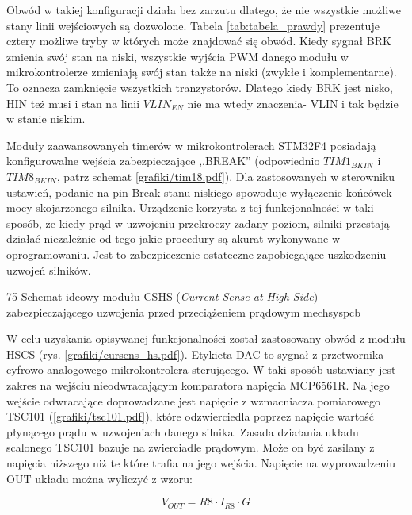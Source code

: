 Obwód w takiej konfiguracji działa bez zarzutu dlatego, że nie wszystkie możliwe stany linii wejściowych są dozwolone. Tabela \ref{tab:tabela_prawdy} prezentuje cztery możliwe tryby w których może znajdować się obwód. Kiedy sygnał BRK zmienia swój stan na niski, wszystkie wyjścia PWM danego modułu w mikrokontrolerze zmieniają swój stan także na niski (zwykłe i komplementarne). To oznacza zamknięcie wszystkich tranzystorów. Dlatego kiedy BRK jest nisko, HIN też musi i stan na linii $ VLIN_{EN} $ nie ma wtedy znaczenia- VLIN i tak będzie w stanie niskim.

\clearpage


Moduły zaawansowanych timerów w mikrokontrolerach STM32F4 posiadają konfigurowalne wejścia zabezpieczające ,,BREAK'' (odpowiednio $ TIM1_{BKIN} $ i $ TIM8_{BKIN} $, patrz schemat \ref{grafiki/tim18.pdf}). Dla zastosowanych w sterowniku ustawień, podanie na pin Break stanu niskiego spowoduje wyłączenie końcówek mocy skojarzonego silnika. Urządzenie korzysta z tej funkcjonalności w taki sposób, że kiedy prąd w uzwojeniu przekroczy zadany poziom, silniki przestają działać niezależnie od tego jakie procedury są akurat wykonywane w oprogramowaniu. Jest to zabezpieczenie ostateczne zapobiegające uszkodzeniu uzwojeń silników.

	{75}
	{Schemat ideowy modułu CSHS ({\it Current Sense at High Side}) zabezpieczającego uzwojenia przed przeciążeniem prądowym}
	{mechsyspcb}
	
W celu uzyskania opisywanej funkcjonalności został zastosowany obwód z modułu HSCS (rys. \ref{grafiki/cursens_hs.pdf}). Etykieta DAC to sygnał z przetwornika cyfrowo-analogowego mikrokontrolera sterującego. W taki sposób ustawiany jest zakres na wejściu nieodwracającym komparatora napięcia MCP6561R. Na jego wejście odwracające doprowadzane jest napięcie z wzmacniacza pomiarowego TSC101 (\ref{grafiki/tsc101.pdf}), które odzwierciedla poprzez napięcie wartość płynącego prądu w uzwojeniach danego silnika. Zasada działania układu scalonego TSC101 bazuje na zwierciadle prądowym. Może on być zasilany z napięcia niższego niż te które trafia na jego wejścia. Napięcie na wyprowadzeniu OUT układu można wyliczyć z wzoru:

\begin{equation} \label{eq:mainboard1}
	V_{OUT} = R8 \cdot I_{R8} \cdot G
\end{equation}

